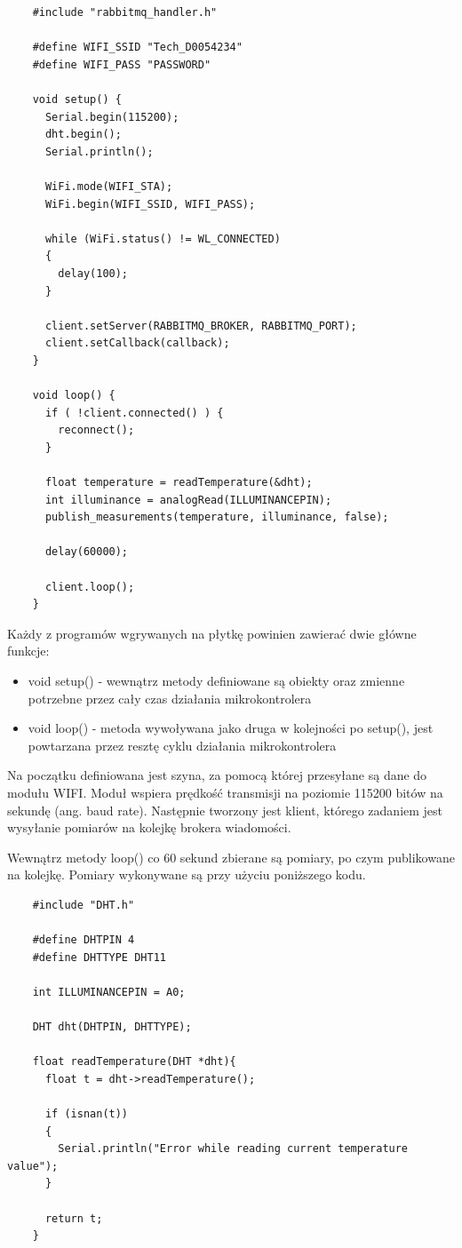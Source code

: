 \documentclass[11pt, a4]{article} %
\begin{document}
\begin{lstlisting}
    #include "rabbitmq_handler.h"

    #define WIFI_SSID "Tech_D0054234"
    #define WIFI_PASS "PASSWORD"
     
    void setup() {
      Serial.begin(115200);
      dht.begin();
      Serial.println();
     
      WiFi.mode(WIFI_STA);
      WiFi.begin(WIFI_SSID, WIFI_PASS);
     
      while (WiFi.status() != WL_CONNECTED)
      {
        delay(100);
      }
      
      client.setServer(RABBITMQ_BROKER, RABBITMQ_PORT);
      client.setCallback(callback);
    }
     
    void loop() {
      if ( !client.connected() ) {
        reconnect();
      }
      
      float temperature = readTemperature(&dht);
      int illuminance = analogRead(ILLUMINANCEPIN);
      publish_measurements(temperature, illuminance, false);
      
      delay(60000);
    
      client.loop();
    }
\end{lstlisting}

Każdy z programów wgrywanych na płytkę powinien zawierać dwie główne funkcje:

\begin{itemize}
    \item void setup() - wewnątrz metody definiowane są obiekty oraz zmienne 
    potrzebne przez cały czas działania mikrokontrolera
    \item void loop() - metoda wywoływana jako druga w kolejności po setup(),
    jest powtarzana przez resztę cyklu działania mikrokontrolera 
\end{itemize}

Na początku definiowana jest szyna, za pomocą której przesyłane są dane do 
modułu WIFI. Moduł wspiera prędkość transmisji na poziomie 115200 bitów na 
sekundę (ang. baud rate). Następnie tworzony jest klient, którego zadaniem
jest wysyłanie pomiarów na kolejkę brokera wiadomości. 

Wewnątrz metody loop() co 60 sekund zbierane są pomiary, po czym publikowane
na kolejkę. Pomiary wykonywane są przy użyciu poniższego kodu.

\begin{lstlisting}
    #include "DHT.h"

    #define DHTPIN 4
    #define DHTTYPE DHT11
    
    int ILLUMINANCEPIN = A0;
    
    DHT dht(DHTPIN, DHTTYPE);
    
    float readTemperature(DHT *dht){
      float t = dht->readTemperature();
     
      if (isnan(t))
      {
        Serial.println("Error while reading current temperature value");
      }
      
      return t;
    }
\end{lstlisting}
\end{document}
